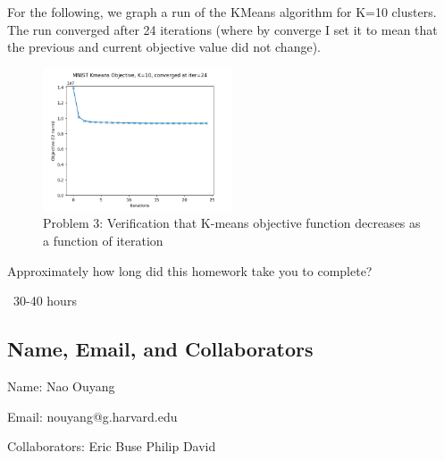 \documentclass[submit]{harvardml}
\newenvironment{answer}{%
\color{answergreen}\sffamily\large}{}
\begin{document}
\begin{itemize}
\begin{answer}
        For the following, we graph a run of the KMeans algorithm for K=10 clusters. The run
        converged after 24 iterations (where by converge I set it to mean that the previous and
        current objective value did not change). 
    \begin{figure}[H]
        \centering
        \includegraphics[width=0.5\textwidth]{p3_costvsiter.png}
        \caption{Problem 3: Verification that K-means objective function decreases as a function of
        iteration}
        \label{cost}
    \end{figure}
\end{answer}

\end{itemize}



\newpage
\begin{problem}[Calibration, 1pt]
Approximately how long did this homework take you to complete?
\end{problem}

~30-40 hours
\subsection*{Name, Email, and Collaborators}

Name: Nao Ouyang

Email: nouyang@g.harvard.edu    

Collaborators:
Eric
Buse
Philip
David
\end{document}
